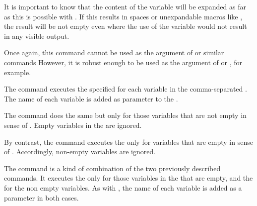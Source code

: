 \begin{Declaration}
\end{Declaration}
It is important to know that the content of the variable will be expanded as
far as this is possible with . If this results in spaces or
unexpandable macros like , the result will be not empty even
where the use of the variable would not result in any visible output.

Once again, this command cannot be used as the argument
of  or similar commands However,
it is robust enough to be used as the argument of
 or , for
example.%
%
\EndIndexGroup


\begin{Declaration}
\end{Declaration}
The 
 command executes the specified  for each
variable in the comma-separated . The name of each
variable is added as parameter to the .%

The  command does the same but only for those
variables that are not empty in sense of
. Empty variables in the  are ignored.

By contrast, the  command executes the
 only for variables that are empty in sense of
. Accordingly, non-empty variables are
ignored.

The  command is a kind of combination of the two
previously described commands. It executes the  only for
those variables in the  that are empty, and the
 for the non empty variables. As with , the
name of each variable is added as a parameter in both cases.%
\EndIndexGroup
%
\EndIndexGroup


